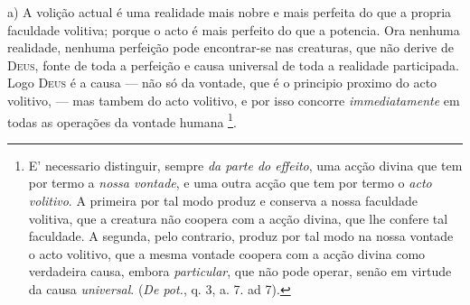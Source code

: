 a) A volição actual é uma realidade mais nobre e mais perfeita do que a propria faculdade volitiva; porque o acto é   mais perfeito do que a potencia. Ora nenhuma realidade, nenhuma perfeição pode encontrar-se nas creaturas, que não derive de \textsc{Deus}, fonte de toda a perfeição e causa universal de toda a realidade participada. Logo \textsc{Deus} é a causa --- não   só da vontade, que é o principio proximo do acto volitivo, --- mas tambem do acto volitivo, e por isso concorre \emph{immediatamente} em todas as operações da vontade humana \footnote{E' necessario distinguir, sempre \emph{da parte do effeito}, uma acção divina que tem por termo a \emph{nossa vontade}, e uma outra acção que tem por termo o \emph{acto volitivo}. A primeira por tal modo produz e conserva a nossa faculdade volitiva, que a creatura não coopera com a acção divina, que lhe confere tal faculdade. A segunda, pelo contrario, produz por tal modo na nossa vontade o acto volitivo, que a mesma vontade coopera com a acção divina como verdadeira causa, embora \emph{particular}, que não pode operar, senão em virtude da causa \emph{universal}. (\emph{De pot.}, q. 3, a. 7. ad 7).}.

